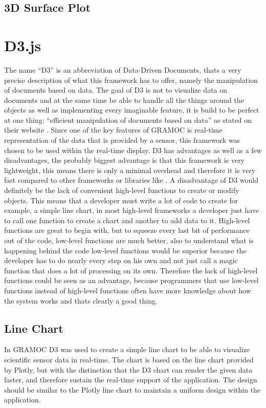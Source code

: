 \subsection{3D Surface Plot}

\section{D3.js}
The name ``D3'' is an abbreviation of Data-Driven Documents, thats a very precise description of what this framework has to offer, namely the manipulation of documents based on data. The goal of D3 is not to visualize data on documents and at the same time be able to handle all the things around the objects as well as implementing every imaginable feature, it is build to be perfect at one thing: ``efficient manipulation of documents based on data'' as stated on their website \cite{d3}. Since one of the key features of GRAMOC is real-time representation of the data that is provided by a sensor, this framework was chosen to be used within the real-time display. D3 has advantages as well as a few disadvantages, the probably biggest advantage is that this framework is very lightweight, this means there is only a minimal overhead and therefore it is very fast compared to other frameworks or libraries like . A disadvantage of D3 would definitely be the lack of convenient high-level functions to create or modify objects. This means that a developer must write a lot of code to create for example, a simple line chart, in most high-level frameworks a developer just have to call one function to create a chart and another to add data to it. High-level functions are great to begin with, but to squeeze every last bit of performance out of the code, low-level functions are much better, also to understand what is happening behind the code low-level functions would be superior because the developer has to do nearly every step on his own and not just call a magic function that does a lot of processing on its own. Therefore the lack of high-level functions could be seen as an advantage, because programmers that use low-level functions instead of high-level functions often have more knowledge about how the system works and thats clearly a good thing.

\subsection{Line Chart}
In GRAMOC D3 was used to create a simple line chart to be able to visualize scientific sensor data in real-time. The chart is based on the line chart provided by Plotly, but with the distinction that the D3 chart can render the given data faster, and therefore sustain the real-time support of the application. The design should be similar to the Plotly line chart to maintain a uniform design within the application.

